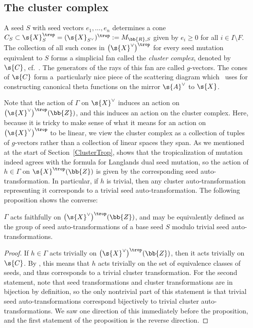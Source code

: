 \subsection{The cluster complex}\label{ClusterComplex}
A seed $S$ with seed vectors $e_1,\dots,e_n$ determines a cone $C_S \subset \s{X}_S^{\trop}=(\s{X}_{S^{\vee}})^{\trop}:=M_{\bb{R},S}$ given by $e_i \geq 0$ for all $i\in I\setminus F$. The collection of all such cones in $\big(\s{X}^{\vee}\big)^{\trop}$ for every seed mutation equivalent to $S$ forms a simplicial fan called the {\it cluster complex}, denoted by $\s{C}$, cf.\ \cite[Theorem~0.8]{GHKK}. The generators of the rays of this fan are called $g$-vectors. The cones of $\s{C}$ form a~particularly nice piece of the scattering diagram which~\cite{GHKK} uses for constructing canonical theta functions on the mirror $\s{A}^{\vee}$ to $\s{X}$.

Note that the action of $\Gamma$ on $\s{X}^{\vee}$ induces an action on $\big(\s{X}^{\vee}\big)^{\trop}(\bb{Z})$, and this induces an action on the cluster complex. Here, because it is tricky to make sense of what it means for an action on $\big(\s{X}^{\vee}\big)^{\trop}$ to be linear, we view the cluster complex as a collection of tuples of $g$-vectors rather than a collection of linear spaces they span. As we mentioned at the start of Section~\ref{ClusterTrop}, \cite{GHK3} shows that the tropicalization of mutation indeed agrees with the formula for Langlands dual seed mutation, so the action of $h\in \Gamma$ on $\s{X}^{\trop}(\bb{Z})$ is given by the corresponding seed auto-transformation. In particular, if $h$ is trivial, then any cluster auto-transformation representing it corresponds to a trivial seed auto-transformation. The following proposition shows the converse:

\begin{prop}\label{TropClust}
$\Gamma$ acts faithfully on $\big(\s{X}^{\vee}\big)^{\trop}(\bb{Z})$, and may be equivalently defined as the group of seed auto-transformations of a base seed $S$ modulo trivial seed auto-transformations.
\end{prop}
\begin{proof}If $h \in \Gamma$ acts trivially on $\big(\s{X}^{\vee}\big)^{\trop}(\bb{Z})$, then it acts trivially on $\s{C}$. By \cite[Theorem~0.8]{GHKK}, this means that $h$ acts trivially on the set of equivalence classes of seeds, and thus corresponds to a trivial cluster transformation. For the second statement, note that seed transformations and cluster transformations are in bijection by definition, so the only nontrivial part of this statement is that trivial seed auto-transformations correspond bijectively to trivial cluster auto-transformations. We saw one direction of this immediately before the proposition, and the first statement of the proposition is the reverse direction.
\end{proof}

